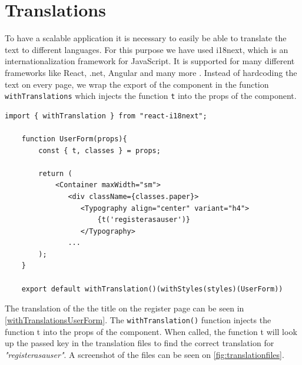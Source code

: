 \section{Translations}
To have a scalable application it is necessary to easily be able to translate the text to different languages.
For this purpose we have used i18next, which is an internationalization framework for JavaScript.
It is supported for many different frameworks like React, .net, Angular and many more \cite{react-i18next}.
Instead of hardcoding the text on every page, we wrap the export of the component in the function \texttt{withTranslations} which injects the function \texttt{t} into the props of the component.  

\begin{lstlisting}[caption={Translated header when registering as a user.}, captionpos=b, label={withTranslationsUserForm}]
    import { withTranslation } from "react-i18next";

    function UserForm(props){
        const { t, classes } = props;

        return (
            <Container maxWidth="sm">
               <div className={classes.paper}>
                  <Typography align="center" variant="h4">
                      {t('registerasauser')}
                  </Typography>
               ...
        );
    }

    export default withTranslation()(withStyles(styles)(UserForm))
\end{lstlisting}
\noindent
The translation of the the title on the register page can be seen in \autoref{withTranslationsUserForm}.
The \texttt{withTranslation()} function injects the function t into the props of the component.
When called, the function t will look up the passed key in the translation files to find the correct translation for  \textit{"registerasauser"}. 
A screenshot of the files can be seen on \autoref{fig:translationfiles}.
